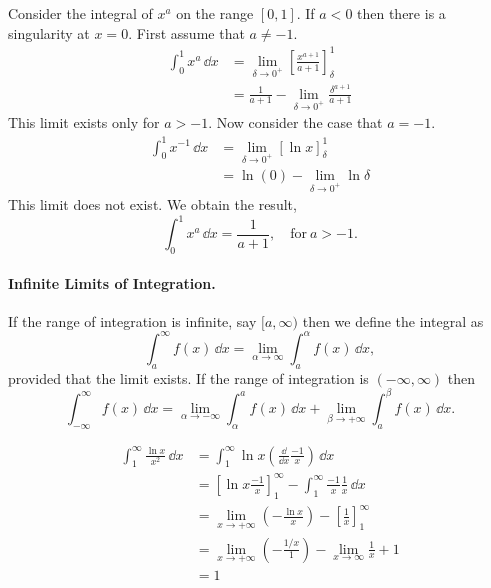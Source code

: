\begin{Example}
  Consider the integral of $x^a$ on the range $[0,1]$.  If $a < 0$ then there
  is a singularity at $x = 0$.  First assume that $a \neq -1$.
  \begin{align*}
    \int_0^1 x^a \,\dd x
    &= \lim_{\delta \to 0^+} \left[ \frac{x^{a+1}}{a+1} \right]_\delta^1 \\
    &= \frac{1}{a+1} - \lim_{\delta \to 0^+} \frac{\delta^{a+1}}{a+1} 
  \end{align*}
  This limit exists only for $a > -1$.  Now consider the case that $a = -1$.
  \begin{align*}
    \int_0^1 x^{-1} \,\dd x
    &= \lim_{\delta \to 0^+} \left[ \ln x \right]_\delta^1 \\
    &= \ln(0) - \lim_{\delta \to 0^+} \ln \delta
  \end{align*}
  This limit does not exist.  We obtain the result,
  \[
  \int_0^1 x^a \,\dd x = \frac{1}{a+1}, \quad \mathrm{for}\ a > -1.
  \]
\end{Example}



\paragraph{Infinite Limits of Integration.}
If the range of integration is infinite, say $[a,\infty)$ then we define
the integral as
\[
\int_a^\infty f(x) \,\dd x = \lim_{\alpha \to \infty} \int_a^\alpha f(x) \,\dd x,
\]
provided that the limit exists.
If the range of integration is $(-\infty,\infty)$ then
\[
\int_{-\infty}^\infty f(x)\,\dd x = \lim_{\alpha \to -\infty} \int_\alpha^a f(x)\,\dd x
+ \lim_{\beta \to +\infty} \int_a^\beta f(x)\,\dd x.
\]



\begin{Example}
  \begin{align*}
    \int_1^\infty \frac{\ln x}{x^2} \,\dd x
    &= \int_1^\infty \ln x \left( \frac{\dd}{\dd x} \frac{-1}{x} \right) 
    \,\dd x \\
    &= \left[ \ln x \frac{-1}{x} \right]_1^\infty 
    - \int_1^\infty \frac{-1}{x} \frac{1}{x} \,\dd x \\
    &= \lim_{x \to +\infty} \left( - \frac{ \ln x }{x} \right) 
    - \left[ \frac{1}{x} \right]_1^\infty \\
    &= \lim_{x \to +\infty} \left( - \frac{ 1/x }{1} \right) 
    - \lim_{x \to \infty} \frac{1}{x} + 1 \\
    &= 1
  \end{align*}
\end{Example}






